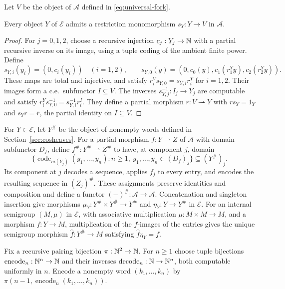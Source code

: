 Let $V$ be the object of $\mathcal A$ defined in
\eqref{eq:universal-fork}.
\begin{lemma}\label{lem:fork-dominance}
Every object $Y$ of $\mathcal E$ admits a restriction monomorphism
$s_Y:Y\to V$ in $\mathcal A$.
\end{lemma}
\begin{proof}
For $j=0,1,2$, choose a recursive injection $c_j:Y_j\to\mathbb N$
with a partial recursive inverse on its image, using a tuple
coding of the ambient finite power. Define
\[
 s_{Y,i}(y_i)=(0,c_i(y_i))\quad(i=1,2),\qquad
 s_{Y,0}(y)=(0,c_0(y),c_1(r_1^Yy),c_2(r_2^Yy)).
\]
These maps are total and injective, and satisfy
$r_i^Vs_{Y,0}=s_{Y,i} r_i^Y$ for $i=1,2$.
Their images form a c.e.\ subfunctor $I\subseteq V$. The inverses
$s_{Y,j}^{-1}:I_j\to Y_j$ are computable and satisfy
$r_i^Y s_{Y,0}^{-1}=s_{Y,i}^{-1}r_i^I$. They define a partial morphism
$r:V\rightharpoonup Y$ with $rs_Y=1_Y$ and $s_Y r=\bar r$, the partial
identity on $I\subseteq V$.
\end{proof}

For $Y\in\mathcal E$, let $Y^\#$ be the object of nonempty words
defined in Section~\ref{sec:cosheaves}.
For a partial morphism $f:Y\rightharpoonup Z$ of $\mathcal A$
with domain subfunctor $D_f$, define
$f^\#:Y^\#\rightharpoonup Z^\#$ to have, at component $j$, domain
\[
 \{\operatorname{code}_{m(Y_j)}(y_1,\ldots,y_n):
          n\ge1,\ y_1,\ldots,y_n\in(D_f)_j\}\subseteq(Y^\#)_j.
\]
Its component at $j$ decodes a sequence, applies $f_j$ to every
entry, and encodes the resulting sequence in $(Z_j)^\#$.
These assignments preserve identities and composition and define
a functor $(-)^\#:\mathcal A\to\mathcal A$.
Concatenation and singleton insertion give morphisms
$\mu_Y:Y^\#\times Y^\#\to Y^\#$ and $\eta_Y:Y\to Y^\#$
in $\mathcal E$.
For an internal semigroup $(M,\mu)$ in $\mathcal E$, with
associative multiplication $\mu:M\times M\to M$, and a morphism
$f:Y\to M$, multiplication of the $f$-images of the entries gives
the unique semigroup morphism $\widehat f:Y^\#\to M$ satisfying
$\widehat f\eta_Y=f$.

Fix a recursive pairing bijection
$\pi:\mathbb N^2\to\mathbb N$. For $n\ge1$ choose tuple bijections
$\operatorname{encode}_n:\mathbb N^n\to\mathbb N$ and their inverses
$\operatorname{decode}_n:\mathbb N\to\mathbb N^n$, both computable uniformly in $n$.
Encode a nonempty word $(k_1,\ldots,k_n)$ by
$\pi(n-1,\operatorname{encode}_n(k_1,\ldots,k_n))$.

